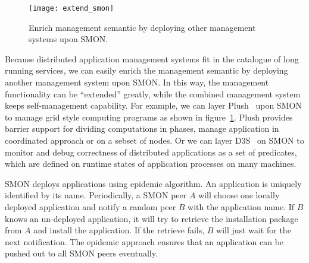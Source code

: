 
\begin{figure}
\centering
\texttt{[image: extend\_smon]}
\caption{Enrich management semantic by deploying other
management systems upon SMON.}
\label{fig:extend_smon}
\end{figure}

Because distributed application management systems fit in
the catalogue of long running services, we can easily enrich
the management semantic by deploying another management
system upon SMON. In this way, the management functionality
can be ``extended'' greatly, while the combined management
system keeps self-management capability. For example, we can
layer Plush~\cite{Albrecht2007} upon SMON to manage grid
style computing programs as shown in
figure~\ref{fig:extend_smon}. Plush provides barrier support
for dividing computations in phases, manage application in
coordinated approach or on a sebset of nodes. Or we can layer
D3S~\cite{Liu2008} on SMON to monitor and debug correctness
of distributed applications as a set of predicates, which
are defined on runtime states of application processes on
many machines.


SMON deploys applications using epidemic algorithm.  An
application is uniquely identified by its name.
Periodically, a SMON peer $A$ will choose one locally
deployed application and notify a random peer $B$ with the
application name. If $B$ knows an un-deployed application,
it will try to retrieve the installation package from $A$
and install the application. If the retrieve fails, $B$ will
just wait for the next notification. The epidemic approach
ensures that an application can be pushed out to all SMON
peers eventually.

